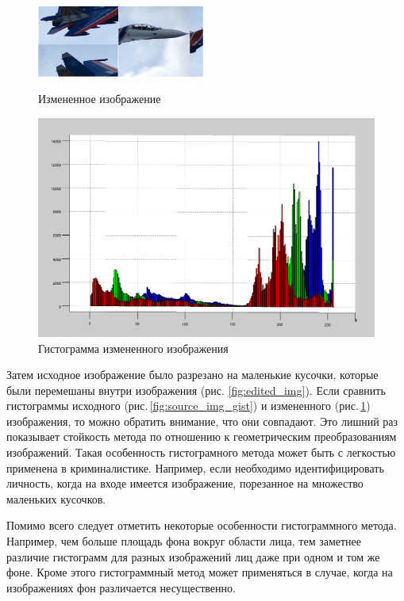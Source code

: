 \documentclass[a4paper,12pt,titlpage]{posobie}
\begin{document}
\begin{figure}[h]
 \parbox[h]{0.49\textwidth}{\centering
   \includegraphics[width=0.49\textwidth]{mig2.png}
   \caption{Измененное изображение}\label{fig:edited_img}}
   \hfil\hfil%
   \begin{minipage}[h]{0.49\textwidth}
     \centering
     \includegraphics[width=\textwidth]{mig_gist.png}
     \caption{Гистограмма измененного изображения}\label{fig:edited_img_gist}
   \end{minipage}
\end{figure}
     Затем исходное изображение было разрезано на маленькие кусочки, которые были перемешаны внутри изображения (рис. \ref{fig:edited_img}).
Если сравнить гистограммы исходного (рис.\,\ref{fig:source_img_gist}) и измененного (рис.\,\ref{fig:edited_img_gist}) изображения,
то можно обратить внимание, что они совпадают. Это лишний раз
показывает стойкость метода по отношению к геометрическим преобразованиям изображений. Такая особенность гистограмного метода может
быть с легкостью применена в криминалистике. Например, если необходимо идентифицировать личность, когда на входе имеется изображение, 
порезанное на множество маленьких кусочков.
 
     Помимо всего следует отметить некоторые особенности гистограммного метода. Например, чем больше площадь фона вокруг области лица,
тем заметнее различие гистограмм для разных изображений лиц даже при одном и том же фоне. Кроме этого гистограммный метод может
применяться в случае, когда на изображениях фон различается несущественно. 
\end{document}
